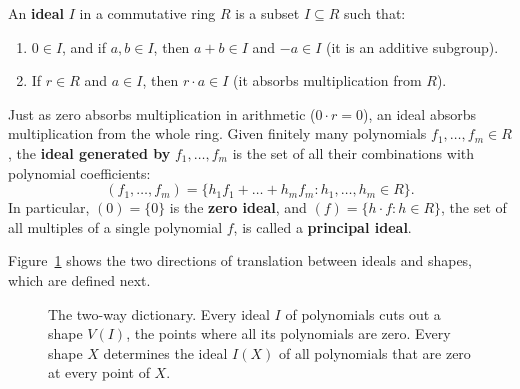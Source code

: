\begin{definition}
An \textbf{ideal} $I$ in a commutative ring $R$ is a subset $I \subseteq R$ such that:
\begin{enumerate}
\item $0 \in I$, and if $a, b \in I$, then $a+b \in I$ and $-a \in I$ (it is an additive subgroup).
\item If $r \in R$ and $a \in I$, then $r \cdot a \in I$ (it absorbs multiplication from $R$).
\end{enumerate}
\end{definition}

Just as zero absorbs multiplication in arithmetic ($0 \cdot r = 0$), an ideal absorbs multiplication from the whole ring. Given finitely many polynomials $f_1, \dots, f_m \in R$, the \textbf{ideal generated by} $f_1, \dots, f_m$ is the set of all their combinations with polynomial coefficients:
\[
(f_1, \dots, f_m) = \{h_1 f_1 + \dots + h_m f_m : h_1, \dots, h_m \in R\}.
\]
In particular, $(0) = \{0\}$ is the \textbf{zero ideal}, and $(f) = \{h \cdot f : h \in R\}$, the set of all multiples of a single polynomial $f$, is called a \textbf{principal ideal}.

Figure~\ref{24:fig-two-worlds} shows the two directions of translation between ideals and shapes, which are defined next.

\begin{figure}[htbp]
\centering
{}
\caption{The two-way dictionary. Every ideal $I$ of polynomials cuts out a shape $V(I)$, the points where all its polynomials are zero. Every shape $X$ determines the ideal $I(X)$ of all polynomials that are zero at every point of $X$.}
\label{24:fig-two-worlds}
\end{figure}


